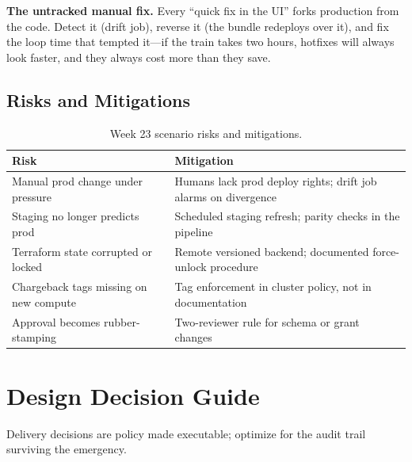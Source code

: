 \begin{pitfall}
\textbf{The untracked manual fix.} Every ``quick fix in the UI'' forks production from the code. Detect it (drift job), reverse it (the bundle redeploys over it), and fix the loop time that tempted it---if the train takes two hours, hotfixes will always look faster, and they always cost more than they save.
\end{pitfall}

\subsection{Risks and Mitigations}
\begin{table}[H]
\centering
\small
\begin{tabular}{@{}p{4.6cm}p{7.6cm}@{}}
\toprule
\textbf{Risk} & \textbf{Mitigation} \\
\midrule
Manual prod change under pressure & Humans lack prod deploy rights; drift job alarms on divergence \\
Staging no longer predicts prod & Scheduled staging refresh; parity checks in the pipeline \\
Terraform state corrupted or locked & Remote versioned backend; documented force-unlock procedure \\
Chargeback tags missing on new compute & Tag enforcement in cluster policy, not in documentation \\
Approval becomes rubber-stamping & Two-reviewer rule for schema or grant changes \\
\bottomrule
\end{tabular}
\caption{Week 23 scenario risks and mitigations.}
\label{tab:ch23-risks}
\end{table}

\section{Design Decision Guide}
%
Delivery decisions are policy made executable; optimize for the audit trail surviving the emergency.

